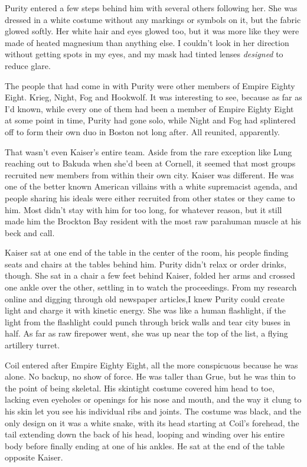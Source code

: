 Purity entered a few steps behind him with several others following her.  She was dressed in a white costume without any markings or symbols on it, but the fabric glowed softly.  Her white hair and eyes glowed too, but it was more like they were made of heated magnesium than anything else.  I couldn't look in her direction without getting spots in my eyes, and my mask had tinted lenses \emph{designed} to reduce glare.



The people that had come in with Purity were other members of Empire Eighty Eight.  Krieg, Night, Fog and Hookwolf.   It was interesting to see, because as far as I'd known, while every one of them had been a member of Empire Eighty Eight at some point in time, Purity had gone solo, while Night and Fog had splintered off to form their own duo in Boston not long after.  All reunited, apparently.



That wasn't even Kaiser's entire team.  Aside from the rare exception like Lung reaching out to Bakuda when she'd been at Cornell, it seemed that most groups recruited new members from within their own city.  Kaiser was different.  He was one of the better known American villains with a white supremacist agenda, and people sharing his ideals were either recruited from other states or they came to him.  Most didn't stay with him for too long, for whatever reason, but it still made him the Brockton Bay resident with the most raw parahuman muscle at his beck and call.



Kaiser sat at one end of the table in the center of the room, his people finding seats and chairs at the tables behind him.  Purity didn't relax or order drinks, though.  She sat in a chair a few feet behind Kaiser, folded her arms and crossed one ankle over the other, settling in to watch the proceedings.  From my research online and digging through old newspaper articles,I knew Purity could create light and charge it with kinetic energy.  She was like a human flashlight, if the light from the flashlight could punch through brick walls and tear city buses in half.  As far as raw firepower went, she was up near the top of the list, a flying artillery turret.



Coil entered after Empire Eighty Eight, all the more conspicuous because he was alone.  No backup, no show of force.  He was taller than Grue, but he was thin to the point of being skeletal.  His skintight costume covered him head to toe, lacking even eyeholes or openings for his nose and mouth, and the way it clung to his skin let you see his individual ribs and joints.  The costume was black, and the only design on it was a white snake, with its head starting at Coil's forehead, the tail extending down the back of his head, looping and winding over his entire body before finally ending at one of his ankles.  He sat at the end of the table opposite Kaiser.



